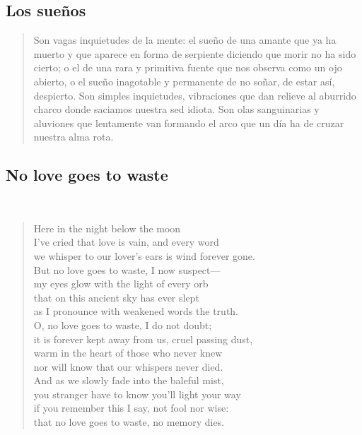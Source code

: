 \documentclass[a4paper, 12pt]{article}
\begin{document}
\pagebreak 
\subsection{Los sueños}

\begin{verse}
Son vagas inquietudes de la mente:
el sueño de una amante que ya ha muerto
y que aparece en forma de serpiente
diciendo que morir no ha sido cierto;
o el de una rara y primitiva fuente
que nos observa como un ojo abierto,
o el sueño inagotable y permanente
de no soñar, de estar así, despierto.
Son simples inquietudes, vibraciones
que dan relieve al aburrido charco
donde saciamos nuestra sed idiota.
Son olas sanguinarias y aluviones
que lentamente van formando el arco
que un día ha de cruzar nuestra alma rota.
\end{verse}

\pagebreak
\subsection{No love goes to waste}
~ 

\begin{verse}
    
Here in the night below the moon\\
I’ve cried that love is vain, and every word\\
we whisper to our lover’s ears is wind forever gone.\\
But no love goes to waste, I now suspect—\\
my eyes glow with the light of every orb\\
that on this ancient sky has ever slept\\
as I pronounce with weakened words the truth.\\
O, no love goes to waste, I do not doubt;\\
it is forever kept away from us, cruel passing dust,\\
warm in the heart of those who never knew\\
nor will know that our whispers never died.\\
And as we slowly fade into the baleful mist,\\
you stranger have to know you’ll light your way\\
if you remember this I say, not fool nor wise:\\
that no love goes to waste, no memory dies.\\
\end{verse}
\end{document}
